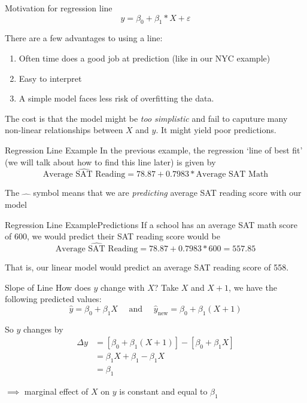 \documentclass[aspectratio=169,t,11pt,table]{beamer}
\begin{document}
\begin{frame}{Motivation for regression line}
  \vspace*{-2\bigskipamount}
  $$
    y = \beta_0 + \beta_1 * X + \varepsilon
  $$

  There are a few advantages to using a line:
  \begin{enumerate}
    \item Often time does a good job at prediction (like in our NYC example)
    \item Easy to interpret 
    \item A simple model faces less risk of overfitting the data.
  \end{enumerate}

  \bigskip
  The cost is that the model might be \emph{too simplistic} and fail to caputure many non-linear relationships between $X$ and $y$. It might yield poor predictions.
\end{frame}

\begin{frame}{Regression Line Example}
  In the previous example, the regression `line of best fit' (we will talk about how to find this line later) is given by 
  $$
    \widehat{\text{Average SAT Reading}} = 78.87 + 0.7983 * \text{Average SAT Math}
  $$
  
  The $\widehat{\quad}$ symbol means that we are \emph{predicting} average SAT reading score with our model
\end{frame}


\begin{frame}{Regression Line Example}{Predictions}
  If a school has an average SAT math score of 600, we would predict their SAT reading score would be 
  $$
    \widehat{\text{Average SAT Reading}} = 78.87 + 0.7983 * 600 = 557.85
  $$

  \pause 
  That is, our linear model would predict an average SAT reading score of 558.
\end{frame}

\begin{frame}{Slope of Line}
  How does $y$ change with $X$? Take $X$ and $X + 1$, we have the following predicted values:
  $$
    \hat{y} = \beta_0 + \beta_1 X \quad\text{ and }\quad 
    \hat{y}_{\text{new}} = \beta_0 + \beta_1 (X + 1)
  $$

  \bigskip
  So $y$ changes by 
  \begin{align*}
    \Delta y &= \left[ \beta_0 + \beta_1 (X + 1) \right] - \left[ \beta_0 + \beta_1 X \right] \\
    &= \beta_1 X + \beta_1 - \beta_1 X \\ 
    &= \beta_1
  \end{align*}

  \bigskip
  $\implies$ marginal effect of $X$ on $y$ is constant and equal to $\beta_1$
\end{frame}
\end{document}
